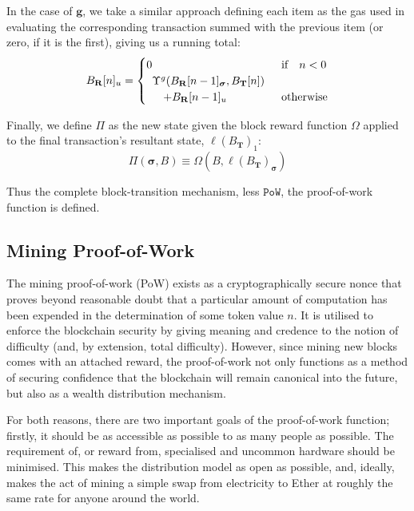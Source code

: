 \documentclass[9pt,oneside]{amsart}
\begin{document}
\begin{multicols}{2}
In the case of $\mathbf{g}$, we take a similar approach defining each item as the gas used in evaluating the corresponding transaction summed with the previous item (or zero, if it is the first), giving us a running total:
\begin{equation}
B_\mathbf{R}[n]_u = \begin{cases} 0 & \text{if} \quad n < 0 \\
\begin{array}[b]{l}
\Upsilon^g(B_\mathbf{R}[n - 1]_{\boldsymbol{\sigma}}, B_\mathbf{T}[n])\\ \quad + B_\mathbf{R}[n-1]_u
\end{array}
 & \text{otherwise} \end{cases}
\end{equation}

Finally, we define $\Pi$ as the new state given the block reward function $\Omega$ applied to the final transaction's resultant state, $\ell(B_\mathbf{T})_1$:
\begin{equation}
\Pi(\boldsymbol{\sigma}, B) \equiv \Omega(B, \ell(B_\mathbf{T})_{\boldsymbol{\sigma}})
\end{equation}

Thus the complete block-transition mechanism, less $\mathtt{PoW}$, the proof-of-work function is defined.

\subsection{Mining Proof-of-Work} \label{ch:pow}

The mining proof-of-work (PoW) exists as a cryptographically secure nonce that proves beyond reasonable doubt that a particular amount of computation has been expended in the determination of some token value $n$. It is utilised to enforce the blockchain security by giving meaning and credence to the notion of difficulty (and, by extension, total difficulty). However, since mining new blocks comes with an attached reward, the proof-of-work not only functions as a method of securing confidence that the blockchain will remain canonical into the future, but also as a wealth distribution mechanism.

For both reasons, there are two important goals of the proof-of-work function; firstly, it should be as accessible as possible to as many people as possible. The requirement of, or reward from, specialised and uncommon hardware should be minimised. This makes the distribution model as open as possible, and, ideally, makes the act of mining a simple swap from electricity to Ether at roughly the same rate for anyone around the world.


\end{multicols}
\end{document}
